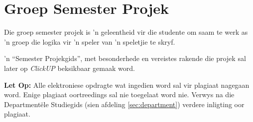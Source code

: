 \section{Groep Semester Projek}
    Die groep semester projek is 'n geleentheid vir die studente om saam te
    werk as 'n groep die logika vir 'n speler van 'n speletjie te skryf.

    'n ``Semester Projekgids'', met besonderhede en vereistes rakende die
    projek sal later op \textit{ClickUP} beksikbaar gemaak word.

    \textbf{Let Op:} Alle elektroniese opdragte wat ingedien word sal vir
    plagiaat nagegaan word. Enige plagiaat oortreedings sal nie toegelaat word
    nie.  Verwys na die Department\"ele Studiegids (sien afdeling
    \ref{sec:department}) verdere inligting oor plagiaat.
